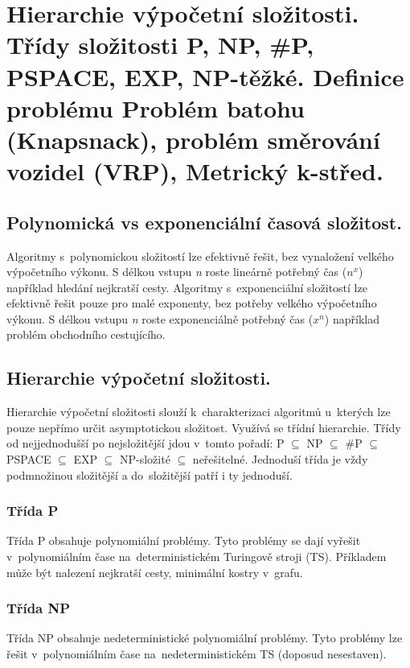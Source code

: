 \section{Hierarchie výpočetní složitosti. Třídy složitosti P, NP, \#P, PSPACE, EXP, NP-těžké. Definice problému Problém batohu (Knapsnack), problém směrování vozidel (VRP), Metrický k-střed.}

\subsection{Polynomická vs exponenciální časová složitost.}

Algoritmy s~polynomickou složitostí lze efektivně řešit, bez vynaložení velkého výpočetního výkonu. 
S délkou vstupu \textit{n} roste lineárně potřebný čas ($n^x$) například hledání nejkratší cesty. 
Algoritmy s~exponenciální složitostí lze efektivně řešit pouze pro malé exponenty, bez potřeby velkého výpočetního výkonu. 
S délkou vstupu \textit{n} roste exponenciálně potřebný čas ($x^n$) například problém obchodního cestujícího.

\subsection{Hierarchie výpočetní složitosti.}

Hierarchie výpočetní složitosti slouží k~charakterizaci algoritmů u~kterých lze pouze nepřímo určit asymptotickou složitost. 
Využívá se třídní hierarchie. 
Třídy od nejjednodušší po nejsložitější jdou v~tomto pořadí: P $\subseteq$ NP $\subseteq$ \#P $\subseteq$ PSPACE $\subseteq$ EXP $\subseteq$ NP-složité $\subseteq$ neřešitelné. 
Jednoduší třída je vždy podmnožinou složitější a do~složitější patří i ty jednoduší.

\subsubsection{Třída P}

Třída P obsahuje polynomiální problémy. 
Tyto problémy se dají vyřešit v~polynomiálním čase na~deterministickém Turingově stroji (TS). 
Příkladem může být nalezení nejkratší cesty, minimální kostry v~grafu.

\subsubsection{Třída NP}

Třída NP obsahuje nedeterministické polynomiální problémy. 
Tyto problémy lze řešit v~polynomiálním čase na~nedeterministickém TS (doposud nesestaven).


